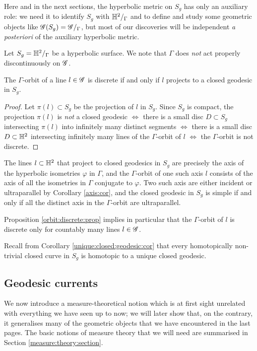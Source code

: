 Here and in the next sections, the hyperbolic metric on $S_g$ has only an auxiliary role: we need it to identify $S_g$ with $\mathbb{H}^2/_\Gamma$ and to define and study some geometric objects like $\mathscr{G}(S_g) = \mathscr{G}/_\Gamma$, but most of our discoveries will be independent \emph{a posteriori} of the auxiliary hyperbolic metric. 

Let $S_g=\mathbb{H}^2/_\Gamma$ be a hyperbolic surface. We note that $\Gamma$ does \emph{not} act properly discontinuously on $\mathscr{G}$.

\begin{prop} \label{orbit:discrete:prop}
The $\Gamma$-orbit of a line $l\in\mathscr{G}$ is discrete if and only if $l$ projects to a closed geodesic in $S_g$.
\end{prop}
\begin{proof}
Let $\pi(l)\subset S_g$ be the projection of $l$ in $S_g$. Since $S_g$ is compact, the projection $\pi(l)$ is \emph{not} a closed geodesic $\Leftrightarrow$ there is a small disc $D \subset S_g$ intersecting $\pi(l)$ into infinitely many distinct segments $\Leftrightarrow$ there is a small disc $D\subset \mathbb{H}^2$ intersecting infinitely many lines of the $\Gamma$-orbit of $l$ $\Leftrightarrow$ the $\Gamma$-orbit is not discrete.
\end{proof}

The lines $l\subset \mathbb{H}^2$ that project to closed geodesics in $S_g$ are precisely the axis of the hyperbolic isometries $\varphi$ in $\Gamma$, and the $\Gamma$-orbit of one such axis $l$ consists of the axis of all the isometries in $\Gamma$ conjugate to $\varphi$. Two such axis are either incident or ultraparallel by Corollary \ref{axis:cor}, and the closed geodesic in $S_g$ is simple if and only if all the distinct axis in the $\Gamma$-orbit are ultraparallel.

Proposition \ref{orbit:discrete:prop} implies in particular that the $\Gamma$-orbit of $l$ is discrete only for countably many lines $l\in\mathscr{G}$. 

Recall from Corollary \ref{unique:closed:geodesic:cor} that every homotopically non-trivial closed curve in $S_g$ is homotopic to a unique closed geodesic. 

\subsection{Geodesic currents} \label{correnti:subsection}
We now introduce a measure-theoretical notion which is at first sight unrelated with everything we have seen up to now; we will later show that, on the contrary, it generalises many of the geometric objects that we have encountered in the last pages. The basic notions of measure theory that we will need are summarised in Section \ref{measure:theory:section}.

